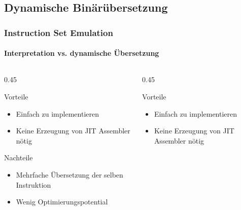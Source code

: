 \subsection{Dynamische Binärübersetzung} %
\begin{frame}
    \frametitle{Instruction Set Emulation}
    \framesubtitle{Interpretation vs. dynamische Übersetzung}
    \begin{columns}[c,onlytextwidth]
        \begin{column}{0.45\textwidth}
            \begin{exampleblock}{Vorteile}
                \begin{itemize}
                    \item[$\textcolor{TUMGreen}\blacksquare$] Einfach zu implementieren
                    \item[$\textcolor{TUMGreen}\blacksquare$] Keine Erzeugung von JIT Assembler nötig
                \end{itemize}
            \end{exampleblock}

            \vspace{0.50cm}

            \begin{alertblock}{Nachteile}
                \begin{itemize}
                    \item[$\textcolor{TUMOrange}\blacksquare$] Mehrfache Übersetzung der selben Instruktion
                    \item[$\textcolor{TUMOrange}\blacksquare$] Wenig Optimierungspotential
                \end{itemize}
            \end{alertblock}
        \end{column}
        \begin{column}{0.45\textwidth}
            \begin{exampleblock}{Vorteile}
                \begin{itemize}
                    \item[$\textcolor{TUMGreen}\blacksquare$] Einfach zu implementieren
                    \item[$\textcolor{TUMGreen}\blacksquare$] Keine Erzeugung von JIT Assembler nötig
                \end{itemize}
            \end{exampleblock}

            \vspace{0.50cm}
        \end{column}
    \end{columns}
\end{frame}

